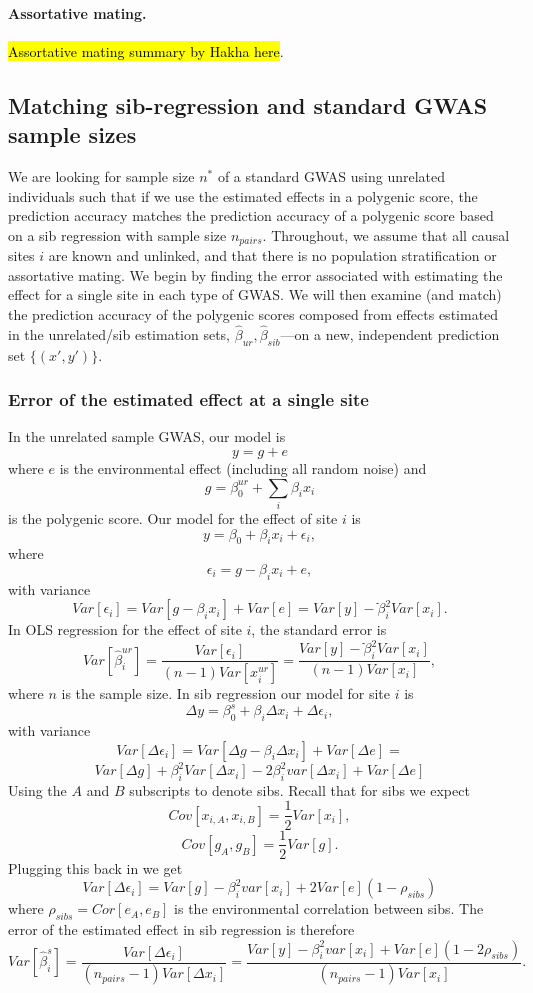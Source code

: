 \documentclass[hidelinks, 12pt]{article}
\begin{document}
\paragraph{Assortative mating.} \hl{Assortative mating summary by Hakha here}.

\subsection{Matching sib-regression and standard GWAS sample sizes}
We are looking for sample size $n^*$ of a standard GWAS using unrelated individuals such that if we use the estimated effects in a polygenic score, the prediction accuracy matches the prediction accuracy of a polygenic score based on a sib regression with sample size $n_{pairs}$. Throughout, we assume that all causal sites $i$ are known and unlinked, and that there is no population stratification or assortative mating.  We begin by finding the error associated with estimating the effect for a single site in each type of GWAS.  We will then examine (and match) the prediction accuracy of the polygenic scores composed from effects estimated in the unrelated/sib estimation sets, $\hat{\beta}_{ur},\hat{\beta}_{sib}$---on a new, independent prediction set $\{(x',y')\}$.

\subsubsection{Error of the estimated effect at a single site}
In the unrelated sample GWAS, our model is
$$y=g+e$$
where $e$ is the environmental effect (including all random noise) and
$$g=\beta^{ur}_0+\sum_{i}\beta_ix_i$$ 
is the polygenic score.  Our model for the effect of site $i$ is 
\begin{equation}
\label{ols_model}
y=\beta_0+\beta_ix_i+\epsilon_i,
\end{equation}
where 
$$\epsilon_i=g-\beta_i x_i+e,$$
with variance
$$Var[\epsilon_i]=Var[g-\beta_i x_i]+Var[e] = Var[y]-ֿ\beta_i^2Var[x_i].$$
In OLS regression for the effect of site $i$, the standard error is
$$Var[\hat{\beta}^{ur}_i]=\frac{Var[\epsilon_i]}{(n-1) Var[x_i^{ur}]} = \frac{Var[y]-ֿ\beta_i^2Var[x_i]}{(n-1)Var[x_i]},$$
where $n$ is the sample size.  In sib regression our model for site $i$ is
$$\Delta y=\beta^{s}_0+\beta_i \Delta x_i+\Delta \epsilon_i,$$
with variance
$$Var[\Delta \epsilon_i] = Var[\Delta g-\beta_i \Delta x_i] + Var[\Delta e] =$$
$$Var[\Delta g]+\beta_i^2Var[\Delta x_i]-2\beta_i^2var[\Delta x_i]+ Var[\Delta e]$$
Using the $A$ and $B$ subscripts to denote sibs. Recall that for sibs we expect
$$Cov[x_{i,A},x_{i,B}]=\frac{1}{2}Var[x_i],$$
$$Cov[g_A,g_B]=\frac{1}{2}Var[g].$$
Plugging this back in we get
$$Var[\Delta \epsilon_i] = Var[g] - \beta_i^2var[x_i] + 2Var[e](1-\rho_{sibs}) $$
where $\rho_{sibs} = Cor[e_A,e_B]$ is the environmental correlation between sibs. The error of the estimated effect in sib regression is therefore
$$Var[\hat{\beta}^{s}_i]=\frac{Var[\Delta \epsilon_i]}{(n_{pairs}-1) Var[\Delta x_i]} = \frac{Var[y] - \beta_i^2var[x_i] + Var[e](1-2\rho_{sibs})}{(n_{pairs}-1) Var[x_i]}.$$
\end{document}
